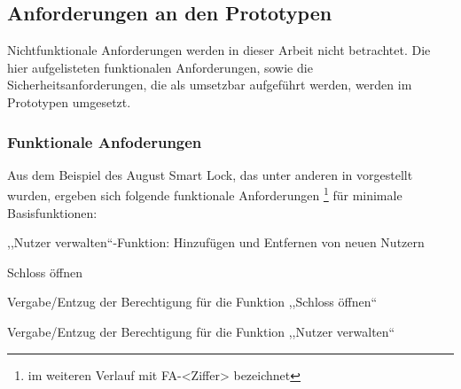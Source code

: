 \subsection{Anforderungen an den Prototypen}
\label{sec:prototype_requirements}
    Nichtfunktionale Anforderungen werden in dieser Arbeit nicht betrachtet. 
    Die hier aufgelisteten funktionalen Anforderungen, sowie die Sicherheitsanforderungen, die als umsetzbar aufgeführt werden, werden im Prototypen umgesetzt. 
    
\subsubsection{Funktionale Anfoderungen}
\label{sec:prototype_func_req}
    Aus dem Beispiel des August Smart Lock, das unter anderen in  vorgestellt wurden, ergeben sich folgende funktionale Anforderungen 
    \!\footnote{im weiteren Verlauf mit FA-<Ziffer> bezeichnet} 
    für minimale Basisfunktionen:
    \begin{FA}[noitemsep]
        \item \label{fa:1},,Nutzer verwalten``-Funktion: Hinzufügen und Entfernen von neuen Nutzern
        \item \label{fa:2}Schloss öffnen
        \item \label{fa:3}Vergabe/Entzug der Berechtigung für die Funktion ,,Schloss öffnen``
        \item \label{fa:4}Vergabe/Entzug der Berechtigung für die Funktion ,,Nutzer verwalten``
    \end{FA}

